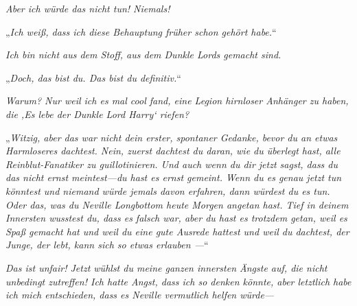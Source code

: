 \emph{Aber ich würde das nicht tun! Niemals! }

„\emph{Ich weiß, dass ich diese Behauptung früher schon gehört habe.}“

\emph{Ich bin nicht aus dem Stoff, aus dem Dunkle Lords gemacht sind. }

„\emph{Doch, das bist du. Das bist du \emph{definitiv}.}“

\emph{Warum? Nur weil ich es mal cool fand, eine Legion hirnloser Anhänger zu haben, die ‚Es lebe der Dunkle Lord Harry‘ riefen? }

„\emph{Witzig, aber das war nicht dein erster, spontaner Gedanke, bevor du an etwas Harmloseres dachtest. Nein, zuerst dachtest du daran, wie du überlegt hast, alle Reinblut-Fanatiker zu guillotinieren. Und auch wenn du dir jetzt sagst, dass du das nicht ernst meintest—du hast es ernst gemeint. Wenn du es genau jetzt tun könntest und niemand würde jemals davon erfahren, dann würdest du es tun. Oder das, was du Neville Longbottom heute Morgen angetan hast. Tief in deinem Innersten \emph{wusstest} du, dass es falsch war, aber du hast es \emph{trotzdem} getan, weil es \emph{Spaß} gemacht hat und weil du eine \emph{gute Ausrede} hattest und weil du dachtest, der Junge, der lebt, kann sich so etwas erlauben —}“

\emph{Das ist unfair! Jetzt wühlst du meine ganzen innersten Ängste auf, die nicht unbedingt zutreffen! Ich \emph{hatte Angst}, dass ich so denken \emph{könnte}, aber letztlich habe ich mich entschieden, dass es Neville vermutlich \emph{helfen} würde—}

